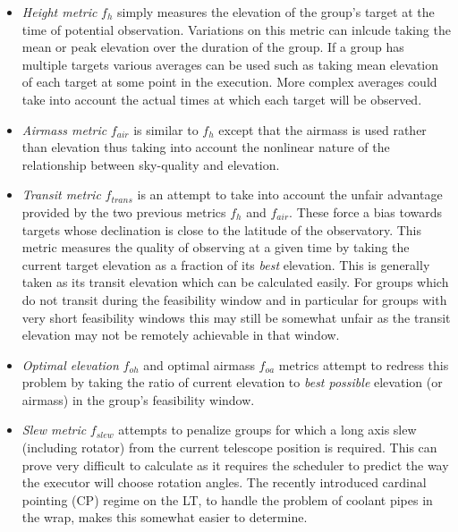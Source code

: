 \begin{itemize}
 
\item \emph{Height metric} $f_h$  simply measures the elevation of the group's target at the time of potential observation. Variations on this metric can inlcude taking the mean or peak elevation over the duration of the group. If a group has multiple targets various averages can be used such as taking mean elevation of each target at some point in the execution. More complex averages could take into account the actual times at which each target will be observed. 
 
\item \emph{Airmass metric} $f_{air}$  is similar to $f_h$ except that the airmass is used rather than elevation thus taking into account the nonlinear nature of the relationship between sky-quality and elevation.

\item \emph{Transit metric} $f_{trans}$  is an attempt to take into account the unfair advantage provided by the two previous metrics $f_h$ and $f_{air}$. These force a bias towards targets whose declination is close to the latitude of the observatory. This metric measures the quality of observing at a given time by taking the current target elevation as a fraction of its \emph{best} elevation. This is generally taken as its transit elevation which can be calculated easily. For groups which do not transit during the feasibility window and in particular for groups with very short feasibility windows this may still be somewhat unfair as the transit elevation may not be remotely achievable in that window.

\item \emph{Optimal elevation} $f_{oh}$ and optimal airmass $f_{oa}$ metrics attempt to redress this problem by taking the ratio of current elevation to \emph{best possible} elevation (or airmass) in the group's feasibility window.  

\item \emph{Slew metric} $f_{slew}$  attempts to penalize groups for which a long axis slew (including rotator) from the current telescope position is required. This can prove very difficult to calculate as it requires the scheduler to predict the way the executor will choose rotation angles. The recently introduced cardinal pointing (CP) regime on the LT, to handle the problem of coolant pipes in the wrap, makes this somewhat easier to determine.


\end{itemize}
